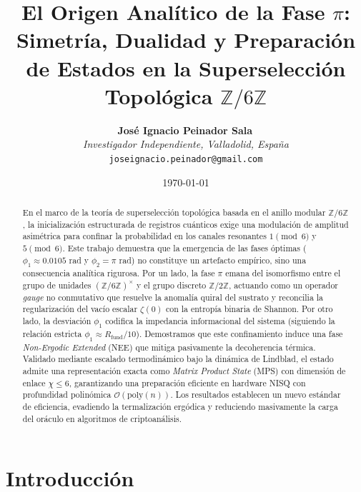 \documentclass[12pt,a4paper]{article}
\theoremstyle{plain}
\theoremstyle{definition}
\theoremstyle{remark}
\begin{document}
\title{El Origen Analítico de la Fase $\pi$: Simetría, Dualidad y Preparación de Estados en la Superselección Topológica $\mathbb{Z}/6\mathbb{Z}$}

\author{
  \textbf{José Ignacio Peinador Sala}\, \\
  \textit{Investigador Independiente, Valladolid, España} \\
  \texttt{joseignacio.peinador@gmail.com}
}

\date{\today}
\maketitle

\begin{abstract}
En el marco de la teoría de superselección topológica basada en el anillo modular $\mathbb{Z}/6\mathbb{Z}$, la inicialización estructurada de registros cuánticos exige una modulación de amplitud asimétrica para confinar la probabilidad en los canales resonantes $1 \pmod 6$ y $5 \pmod 6$. Este trabajo demuestra que la emergencia de las fases óptimas ($\phi_1 \approx 0.0105$ rad y $\phi_2 = \pi$ rad) no constituye un artefacto empírico, sino una consecuencia analítica rigurosa. Por un lado, la fase $\pi$ emana del isomorfismo entre el grupo de unidades $(\mathbb{Z}/6\mathbb{Z})^{\times}$ y el grupo discreto $\mathbb{Z}/2\mathbb{Z}$, actuando como un operador \textit{gauge} no conmutativo que resuelve la anomalía quiral del sustrato y reconcilia la regularización del vacío escalar $\zeta(0)$ con la entropía binaria de Shannon. Por otro lado, la desviación $\phi_1$ codifica la impedancia informacional del sistema (siguiendo la relación estricta $\phi_1 \approx R_{\text{fund}}/10$). Demostramos que este confinamiento induce una fase \textit{Non-Ergodic Extended} (NEE) que mitiga pasivamente la decoherencia térmica. Validado mediante escalado termodinámico bajo la dinámica de Lindblad, el estado admite una representación exacta como \textit{Matrix Product State} (MPS) con dimensión de enlace $\chi \le 6$, garantizando una preparación eficiente en hardware NISQ con profundidad polinómica $\mathcal{O}(\text{poly}(n))$. Los resultados establecen un nuevo estándar de eficiencia, evadiendo la termalización ergódica y reduciendo masivamente la carga del oráculo en algoritmos de criptoanálisis.
\end{abstract}

\tableofcontents
\newpage

\section{Introducción}
\end{document}
